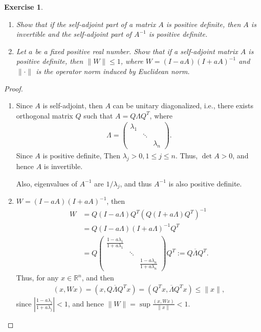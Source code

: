 \documentclass[11pt]{article}
\newtheorem{exercise}{Exercise}[section]
\theoremstyle{definition}
\numberwithin{equation}{subsection}
\begin{document}
\begin{exercise}
~\begin{enumerate}[label=(\alph*)]
    \item Show that if the self-adjoint part of a matrix $A$ is positive definite, then $A$ is invertible and the self-adjoint part of $A^{-1}$ is positive definite.
    
    \item Let $a$ be a fixed positive real number. Show that if a self-adjoint matrix $A$ is positive definite, then $\|W\| \leq 1$, where $W = (I - a A)(I + a A)^{-1}$ and $\|\cdot\|$ is the operator norm induced by Euclidean norm.
\end{enumerate}
\end{exercise}
\begin{proof}
~\begin{enumerate}[label=(\alph*)]
    \item Since $A$ is self-adjoint, then $A$ can be unitary diagonalized, i.e., there exists orthogonal matrix $Q$ such that $A = Q \Lambda Q^T$, where \begin{align*}
        \Lambda = \begin{pmatrix}
            \lambda_1 &  & \\
            & \ddots &     \\
            & & \lambda_n
        \end{pmatrix}.
    \end{align*}
    Since $A$ is positive definite, Then $\lambda_j > 0, 1 \leq j \leq n$. Thus, $\det A > 0$, and hence $A$ is invertible.
    
    Also, eigenvalues of $A^{-1}$ are $1/\lambda_j$, and thus $A^{-1}$ is also positive definite.
    
    \item $W = (I - a A)(I + a A)^{-1}$, then 
    \begin{align*}
        W & = Q(I - a \Lambda)Q^T \left(Q(I + a \Lambda)Q^T\right)^{-1} \\
        & = Q (I - a \Lambda)(I + a \Lambda)^{-1} Q^T \\
        & = Q \begin{pmatrix}
            \frac{1 - a\lambda_1}{1 + a\lambda_1} &  & \\
            & \ddots &     \\
            & & \frac{1 - a\lambda_n}{1 + a\lambda_n}
        \end{pmatrix} Q^T := Q \overline{\Lambda} Q^T.
    \end{align*}
    Thus, for any $x \in \mathbb{R}^n$, and then 
    \begin{align*}
        (x, W x) = \left(x, Q \overline{\Lambda} Q^T x\right) = \left(Q^Tx, \overline{\Lambda} Q^T x\right) \leq \|x\|,
    \end{align*}
    since $\left|\frac{1 - a\lambda_j}{1 + a\lambda_j}\right| < 1$, and hence $\|W\| = \sup \frac{(x, W x)}{\|x\|} < 1$.
\end{enumerate}
\end{proof}
\end{document}
